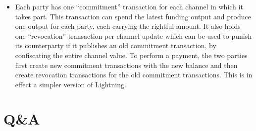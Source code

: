 \begin{itemize}
  \item Each party has one ``commitment'' transaction for each channel in which
  it takes part. This transaction can spend the latest funding output and
  produce one output for each party, each carrying the rightful amount. It also
  holds one ``revocation'' transaction per channel update which can be used to
  punish its counterparty if it publishes an old commitment transaction, by
  confiscating the entire channel value. To perform a payment, the two parties
  first create new commitment transactions with the new balance and then create
  revocation transactions for the old commitment transactions. This is in effect
  a simpler version of Lightning.
\end{itemize}

\section*{Q\&A}
